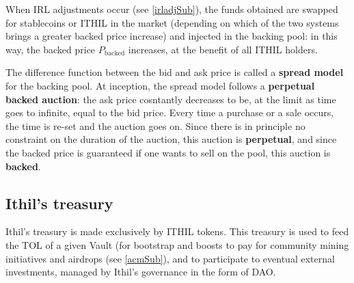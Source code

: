 \documentclass[a4paper,10 pt]{article}
\theoremstyle{definition}
\begin{document}
When IRL adjustments occur (see \ref{irladjSub}), the funds obtained are swapped for stablecoins or ITHIL in the market (depending on which of the two systems brings a greater backed price increase) and injected in the backing pool: in this way, the backed price $P_{\text{backed}}$ increases, at the benefit of all ITHIL holders.

The difference function between the bid and ask price is called a {\bf spread model} for the backing pool. At inception, the spread model follows a {\bf perpetual backed auction}: the ask price cosntantly decreases to be, at the limit as time goes to infinite, equal to the bid price. Every time a purchase or a sale occurs, the time is re-set and the auction goes on. Since there is in principle no constraint on the duration of the auction, this auction is {\bf perpetual}, and since the backed price is guaranteed if one wants to sell on the pool, this auction is {\bf backed}.

\subsection{Ithil's treasury}\label{ItSub}
Ithil's treasury is made exclusively by ITHIL tokens. This treasury is used to feed the TOL of a given Vault (for bootstrap and boosts to pay for community mining initiatives and airdrops (see \ref{acmSub}), and to participate to eventual external investments, managed by Ithil's governance in the form of DAO.
\end{document}
